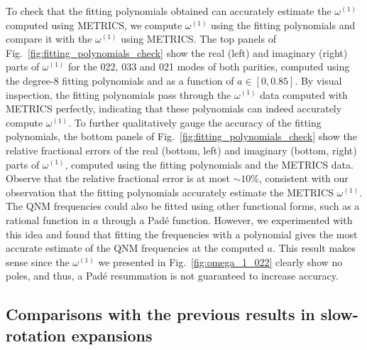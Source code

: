 \documentclass[aps,prx,amsmath,floats,floatfix,twocolumn,
  superscriptaddress,nofootinbib,showpacs]{revtex4-1}
\begin{document}
To check that the fitting polynomials obtained can accurately estimate the $\omega^{(1)}$ computed using METRICS, we compute $\omega^{(1)}$ using the fitting polynomials and compare it with the $\omega^{(1)}$ using METRICS. The top panels of Fig.~\ref{fig:fitting_polynomials_check} show the real (left) and imaginary (right) parts of $\omega^{(1)}$ for the 022, 033 and 021 modes of both parities, computed using the degree-8 fitting polynomials and as a function of $a \in [0, 0.85]$. 
By visual inspection, the fitting polynomials pass through the $\omega^{(1)}$ data computed with METRICS perfectly, indicating that these polynomials can indeed accurately compute $\omega^{(1)}$. 
To further qualitatively gauge the accuracy of the fitting polynomials, the bottom panels of Fig.~\ref{fig:fitting_polynomials_check} show the relative fractional errors of the real (bottom, left) and imaginary (bottom, right) parts of $\omega^{(1)}$, computed using the fitting polynomials and the METRICS data. 
Observe that the relative fractional error is at most $\sim 10 \%$, consistent with our observation that the fitting polynomials accurately estimate the METRICS $\omega^{(1)}$.
The QNM frequencies could also be fitted using other functional forms, such as a rational function in $a$ through a Pad\'e function. 
However, we experimented with this idea and found that fitting the frequencies with a polynomial gives the most accurate estimate of the QNM frequencies at the computed $a$. This result makes sense since the $\omega^{(1)}$ we presented in Fig.~\ref{fig:omega_1_022} clearly show no poles, and thus, a Pad\'e resummation is not guaranteed to increase accuracy. 

\subsection{Comparisons with the previous results in slow-rotation expansions}
\label{sec:Reslts_comparison}
\end{document}
